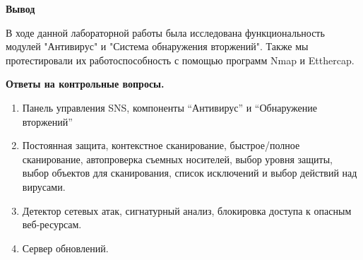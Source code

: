 \documentclass[a4paper,14pt]{extarticle}
\begin{document}
    \textbf{Вывод}\par
    В ходе данной лабораторной работы была исследована функциональность модулей "Антивирус" и "Система обнаружения вторжений". 
    Также мы протестировали их работоспособность с помощью программ Nmap и Etthercap.

    \textbf{Ответы на контрольные вопросы.}
    \begin{enumerate}
        \singlespacing
        \item Панель управления SNS, компоненты “Антивирус” и “Обнаружение вторжений”
        \item Постоянная защита, контекстное сканирование, быстрое/полное сканирование, автопроверка съемных носителей, выбор уровня защиты, выбор объектов для сканирования, список исключений и выбор действий над вирусами.
        \item Детектор сетевых атак, сигнатурный анализ, блокировка доступа к опасным веб-ресурсам.
        \item Сервер обновлений.
    \end{enumerate}
\end{document}

